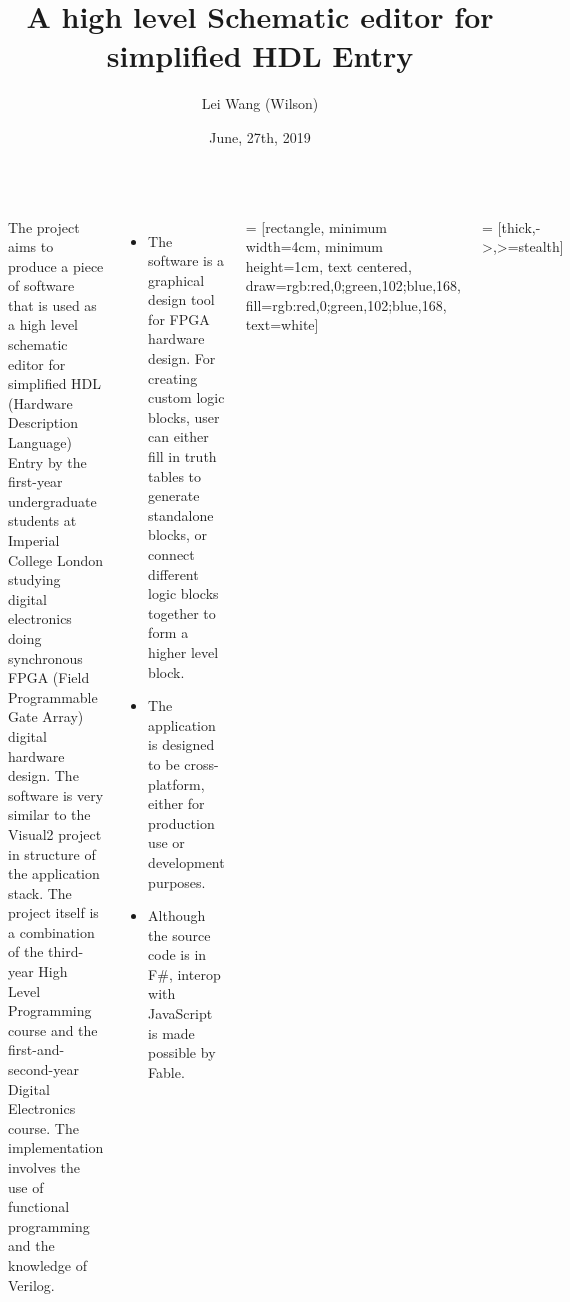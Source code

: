 \documentclass[12pt, a1paper, landscape, margin=10mm, innermargin=15mm, blockverticalspace=15mm, colspace=15mm, subcolspace=8mm]{tikzposter}
\title{A high level Schematic editor for simplified HDL Entry}
\author{Lei Wang (Wilson)}
\date{June, 27th, 2019}
\institute{Imperial College London}
\begin{document}
 
\maketitle

\begin{columns}
    {The project aims to produce a piece of software that is used as a high level schematic editor for simplified HDL (Hardware Description Language) Entry by the first-year undergraduate students at Imperial College London studying digital electronics doing synchronous FPGA (Field Programmable Gate Array) digital hardware design. The software is very similar to the Visual2 project in structure of the application stack. The project itself is a combination of the third-year High Level Programming course and the first-and-second-year Digital Electronics course. The implementation involves the use of functional programming and the knowledge of Verilog.}
    
    {
    
\begin{itemize}
    \item The software is a graphical design tool for FPGA hardware design. For creating custom logic blocks, user can either fill in truth tables to generate standalone blocks, or connect different logic blocks together to form a higher level block.
    \item The application is designed to be cross-platform, either for production use or development purposes.
    \item Although the source code is in F\#, interop with JavaScript is made possible by Fable.
\end{itemize}
    }
    
    {
 = [rectangle, minimum width=4cm, minimum height=1cm, text centered, draw={rgb:red,0;green,102;blue,168}, fill={rgb:red,0;green,102;blue,168}, text=white]

 = [thick,->,>=stealth]

}
\end{columns}
\end{document}
